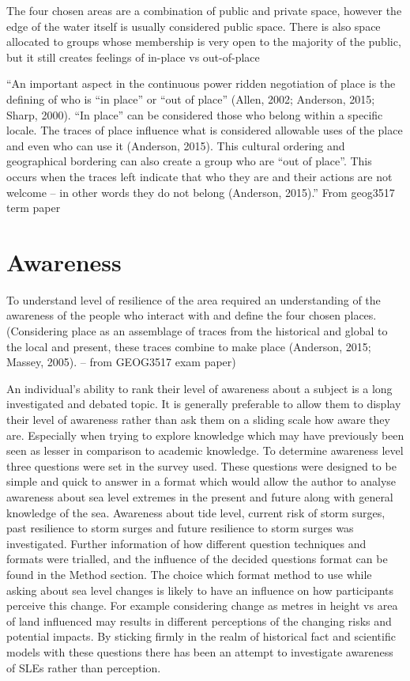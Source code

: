 \documentclass{article}
\begin{document}
The four chosen areas are a combination of public and private space, however the edge of the water itself is usually considered public space. There is also space allocated to groups whose membership is very open to the majority of the public, but it still creates feelings of in-place vs out-of-place


“An important aspect in the continuous power ridden negotiation of place is the defining of who is “in place” or “out of place” (Allen, 2002; Anderson, 2015; Sharp, 2000). “In place” can be considered
those who belong within a specific locale. The traces of place influence what is considered
allowable uses of the place and even who can use it (Anderson, 2015). This cultural ordering
and geographical bordering can also create a group who are “out of place”. This occurs when
the traces left indicate that who they are and their actions are not welcome – in other words
they do not belong (Anderson, 2015).” From geog3517 term paper

\section{Awareness}
To understand level of resilience of the area required an understanding of the awareness of the people who interact with and define the four chosen places. (Considering place as an assemblage of traces from the historical and global to the local and present, these traces combine to make place (Anderson, 2015; Massey, 2005). – from GEOG3517 exam paper)

An individual’s ability to rank their level of awareness about a subject is a long investigated and debated topic. It is generally preferable to allow them to display their level of awareness rather than ask them on a sliding scale how aware they are. Especially when trying to explore knowledge which may have previously been seen as lesser in comparison to academic knowledge. 
To determine awareness level three questions were set in the survey used. These questions were designed to be simple and quick to answer in a format which would allow the author to analyse awareness about sea level extremes in the present and future along with general knowledge of the sea. 
Awareness about tide level, current risk of storm surges, past resilience to storm surges and future resilience to storm surges was investigated. Further information of how different question techniques and formats were trialled, and the influence of the decided questions format can be found in the Method section. The choice which format method to use while asking about sea level changes is likely to have an influence on how participants perceive this change. For example considering change as metres in height vs area of land influenced may results in different perceptions of the changing risks and potential impacts.  By sticking firmly in the realm of historical fact and scientific models with these questions there has been an attempt to investigate awareness of SLEs rather than perception. 
\end{document}
